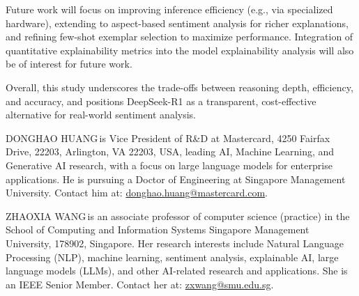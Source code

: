 \documentclass{IEEEcsmag}
\begin{document}
Future work will focus on improving inference efficiency (e.g., via specialized hardware), extending to aspect-based sentiment analysis for richer explanations, and refining few-shot exemplar selection to maximize performance. Integration of quantitative explainability metrics into the model explainability analysis will also be of interest for future work.


Overall, this study underscores the trade-offs between reasoning depth, efficiency, and accuracy, and positions DeepSeek-R1 as a transparent, cost-effective alternative for real-world sentiment analysis.

\vspace{-20pt}



\vspace{-12pt}
\begin{IEEEbiography}{DONGHAO HUANG}{\,}is Vice President of R\&D at Mastercard, 4250 Fairfax Drive, 22203, Arlington, VA 22203, USA, leading AI, Machine Learning, and Generative AI research, with a focus on large language models for enterprise applications. He is pursuing a Doctor of Engineering at Singapore Management University. Contact him at: \href{mailto:donghao.huang@mastercard.com}{donghao.huang@mastercard.com}.
\end{IEEEbiography}

\vspace{-10pt}
\begin{IEEEbiography}{ZHAOXIA WANG}{\,}is an associate professor of computer science (practice) in the School of Computing and Information Systems Singapore Management University, 178902, Singapore. Her research interests include Natural Language Processing (NLP), machine learning, sentiment analysis, explainable AI, large language models (LLMs), and other AI-related research and applications. She is an IEEE Senior Member. Contact her at: \href{mailto:zxwang@smu.edu.sg}{zxwang@smu.edu.sg}.
\end{IEEEbiography}
\end{document}
